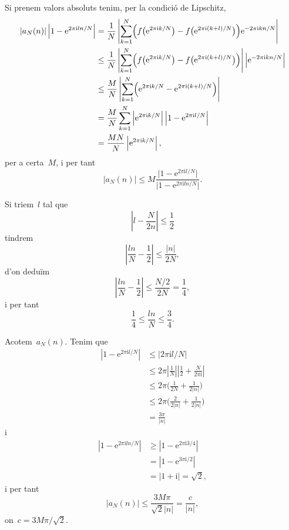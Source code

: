 \documentclass[a4paper]{article}
\theoremstyle{plain}
\theoremstyle{definition}
\newcommand{\iu}{\mathrm{i}}
\newcommand{\e}{\mathrm{e}}
\providecommand{\uppi}{\pi}
\newcommand{\abs}[1]{\lvert{#1}\rvert}
\newcommand{\Abs}[1]{\left\lvert{#1}\right\rvert}
\begin{document}
Si prenem valors absoluts tenim, per la condició de Lipschitz,
\begin{align*}
    \abs{a_{N}(n)}
    \Abs{1-\e^{2\uppi\iu ln/N}}
    &=
    \frac{1}{N}
    \Abs{
        \sum_{k=1}^{N}
        \Bigl(
            f\bigl(
                \e^{2\uppi\iu k/N}
            \bigr)
            -
            f\bigl(
                \e^{2\uppi\iu(k+l)/N}
            \bigr)
        \Bigr)
        \e^{-2\uppi\iu kn/N}
    } \\
    &\leq
    \frac{1}{N}
    \Abs{
        \sum_{k=1}^{N}
        \Bigl(
            f\bigl(
                \e^{2\uppi\iu k/N}
            \bigr)
            -
            f\bigl(
                \e^{2\uppi\iu(k+l)/N}
            \bigr)
        \Bigr)
    }
    \Abs{
        \e^{-2\uppi\iu kn/N}
    } \\
    &\leq
    \frac{M}{N}
    \Abs{
        \sum_{k=1}^{N}
        \Bigl(
            \e^{2\uppi\iu k/N}
            -
            \e^{2\uppi\iu(k+l)/N}
        \Bigr)
    } \\
    &=
    \frac{M}{N}
    \sum_{k=1}^{N}
    \Abs{\e^{2\uppi\iu k/N}}
    \Abs{1-\e^{2\uppi\iu l/N}} \\
    &=
    \frac{MN}{N}
    \Abs{\e^{2\uppi\iu k/N}},
\end{align*}
per a certa~\(M\),
i per tant
\[
    \abs{a_{N}(n)}
    \leq
    M
    \frac{\abs{1-\e^{2\uppi\iu l/N}}}{\abs{1-\e^{2\uppi\iu ln/N}}}.
\]

Si triem~\(l\) tal que
\[
    \Abs{l-\frac{N}{2n}}
    \leq
    \frac{1}{2}
\]
tindrem
\[
    \Abs{\frac{ln}{N} - \frac{1}{2}}
    \leq
    \frac{\abs{n}}{2N},
\]
d'on deduïm
\[
    \Abs{\frac{ln}{N} - \frac{1}{2}}
    \leq
    \frac{N/2}{2N}
    =
    \frac{1}{4},
\]
i per tant
\[
    \frac{1}{4}
    \leq
    \frac{ln}{N}
    \leq
    \frac{3}{4}.
\]

Acotem~\(a_{N}(n)\). Tenim que
\begin{align*}
    \Abs{1-\e^{2\uppi\iu l/N}}
    &\leq \abs{2\uppi\iu l/N} \\
    &\leq 2\uppi\Abs{\frac{1}{N}}\Abs{\frac{1}{2} + \frac{N}{2\uppi\iu}} \\
    &\leq 2\uppi\biggl(
        \frac{1}{2N} + \frac{1}{2\abs{n}}
    \biggr) \\
    &\leq 2\uppi\biggl(
        \frac{2}{2\abs{n}} + \frac{1}{2\abs{n}}
    \biggr) \\
    &= \frac{3\uppi}{\abs{n}}
\end{align*}
i
\begin{align*}
    \Abs{1-\e^{2\uppi\iu ln/N}}
    &\geq \Abs{1-\e^{2\uppi\iu 3/4}} \\
    &= \Abs{1-\e^{3\uppi\iu/2}} \\
    &= \abs{1+\iu} = \sqrt{2},
\end{align*}
i per tant
\[
    \abs{a_{N}(n)} \leq \frac{3M\uppi}{\sqrt{2}\abs{n}} = \frac{c}{\abs{n}},
\]
on~\(c=3M\uppi/\sqrt{2}\).
\end{document}
